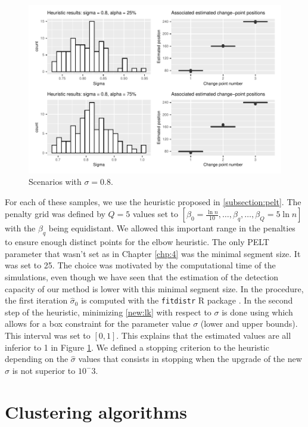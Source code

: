 \begin{appendices}
\begin{figure}[ht]
    \centering
    \includegraphics{figs/App/SIM_CHAP5_2.pdf}
    \caption{Scenarios with $\sigma = 0.8$.}
    \label{fig:sim:sigma2}
\end{figure}

For each of these samples, we use the heuristic proposed in \ref{subsection:pelt}. The penalty grid was defined by $Q = 5$ values set to $[\beta_0 = \frac{\ln n}{10},\dots,\beta_{q},\dots,\beta_{Q} = 5\ln n]$ with the $\beta_q$ being equidistant. We allowed this important range in the penalties to ensure enough distinct points for the elbow heuristic. The only PELT parameter that wasn't set as in Chapter \ref{chp:4} was the minimal segment size. It was set to 25. The choice was motivated by the computational time of the simulations, even though we have seen that the estimation of the detection capacity of our method is lower with this minimal segment size. In the procedure, the first iteration $\widehat{\sigma}_0$ is computed with the \texttt{fitdistr} R package \cite{delignette2015}. In the second step of the heuristic, minimizing \ref{new:lk} with respect to $\sigma$ is done using \cite{Byrd1995} which allows for a box constraint for the parameter value $\sigma$ (lower and upper bounds). This interval was set to $[0,1]$. This explains that the estimated values are all inferior to 1 in Figure \ref{fig:sim:sigma2}. We defined a stopping criterion to the heuristic depending on the $\widehat{\sigma}$ values that consists in stopping when the upgrade of the new $\widehat{\sigma}$ is not superior to $10^-3$.

\section{Clustering algorithms}\label{app:clustalgo:chap5}


\end{appendices}
